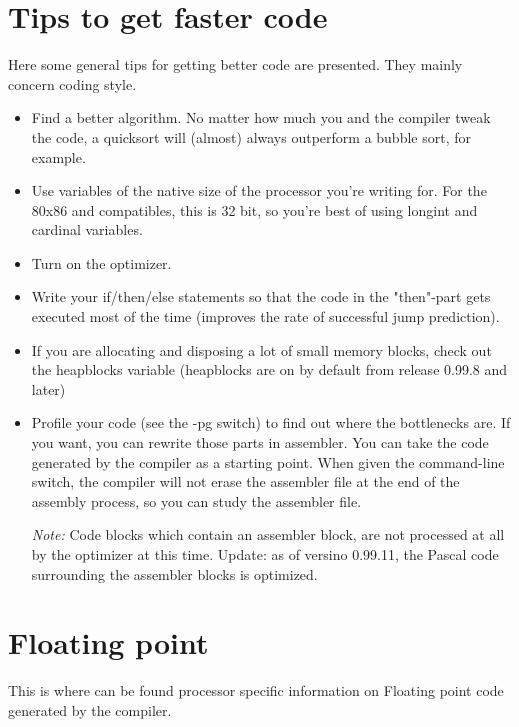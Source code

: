 \documentclass{report}
\begin{document}
\section{Tips to get faster code}
Here some general tips for getting better code are presented. They
mainly concern coding style.

\begin{itemize}
\item Find a better algorithm. No matter how much you and the compiler 
tweak the code, a quicksort will (almost) always outperform a bubble 
sort, for example.

\item Use variables of the native size of the processor you're writing 
for. For the 80x86 and compatibles, this is 32 bit, so you're best of 
using longint and cardinal variables.

\item Turn on the optimizer.

\item Write your if/then/else statements so that the code in the "then"-part
gets executed most of the time (improves the rate of successful jump prediction).

\item If you are allocating and disposing a lot of small memory blocks, 
check out the heapblocks variable (heapblocks are on by default from
release 0.99.8 and later)

\item Profile your code (see the -pg switch) to find out where the 
bottlenecks are. If you want, you can rewrite those parts in assembler. 
You can take the code generated by the compiler as a starting point. When
given the  command-line switch, the compiler will not erase the
assembler file at the end of the assembly process, so you can study the
assembler file.
 
{\em Note:} Code blocks which contain an assembler block, are not processed 
at all by the optimizer at this time. Update: as of versino 0.99.11, the Pascal
code surrounding the assembler blocks is optimized.
\end{itemize}

\section{ Floating point }

This is where can be found processor specific information on Floating
point code generated by the compiler.
\end{document}
